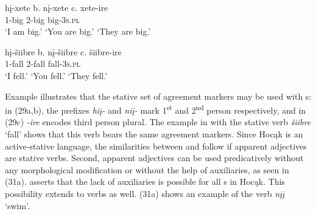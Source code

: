 \documentclass[output=paper]{LSP/langsci}
\begin{document}
\begin{exe}
\ex\label{ex:rosen:29}
\begin{xlist}
\ex \gll
hį-xete \hspace{36pt} b. {}  nį-xete \hspace{48pt} c. {} xete-ire\\
1-big {} {} {} 2-big {} {}  {} big-\textsc{3s.pl}\\
\glt `I am big.' \hspace{1.2cm} `You are big.' \hspace{1.1cm} `They are big.'

\end{xlist}
\end{exe}

\begin{exe}
\ex\label{ex:rosen:30}
\begin{xlist}
\ex \gll
hį-šiibre \hspace{30pt}  b. {} nį-šiibre \hspace{43pt} c. {} šiibre-ire\\
1-fall {} {} {} 2-fall {} {} {} fall-\textsc{3s.pl}\\
\glt `I fell.' \hspace{1.8cm} `You fell.'  \hspace{1.8cm} `They fell.'


\end{xlist}
\end{exe}

Example  illustrates that the stative set of agreement markers may be used with s: in (29a,b), the prefixes \textit{hiį-} and \textit{niį-} mark 1\textsuperscript{st} and 2\textsuperscript{nd} person respectively, and in (29c) \textit{-ire} encodes third person plural. The example in  with the stative verb \textit{šiibre} `fall' shows that this verb bears the same agreement markers. Since Hocąk is an active-stative language, the similarities between  and  follow if apparent adjectives are stative verbs. Second, apparent adjectives can be used predicatively without any morphological modification or without the help of auxiliaries, as seen in (31a). \citet{Helmbrecht2006b} asserts that the lack of auxiliaries is possible for all s in Hocąk. This possibility extends to verbs as well. (31a) shows an example of the verb \textit{nįį} `swim'.
\end{document}
